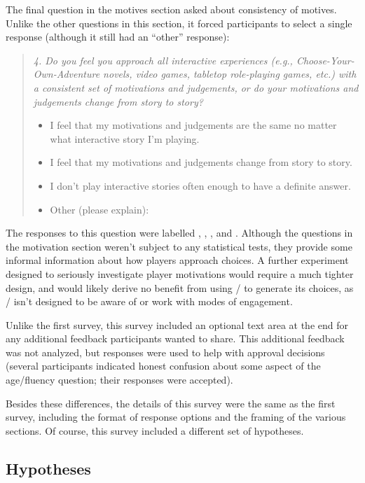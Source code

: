 The final question in the motives section asked about consistency of motives.
%
Unlike the other questions in this section, it forced participants to select a single response (although it still had an ``other'' response):
%
\begin{quote}
  \slshape
  4. Do you feel you approach all interactive experiences (e.g., Choose-Your-Own-Adventure novels, video games, tabletop role-playing games, etc.) with a consistent set of motivations and judgements, or do your motivations and judgements change from story to story?
  \begin{itemize}
    \item[\ding{109}] I feel that my motivations and judgements are the same no matter what interactive story I'm playing.
    \item[\ding{109}] I feel that my motivations and judgements change from story to story.
    \item[\ding{109}] I don't play interactive stories often enough to have a definite answer.
    \item[\ding{109}] Other (please explain):
  \end{itemize}
\end{quote}
%
The responses to this question were labelled , , , and .
%
Although the questions in the motivation section weren't subject to any statistical tests, they provide some informal information about how players approach choices.
%
A further experiment designed to seriously investigate player motivations would require a much tighter design, and would likely derive no benefit from using \dunyazad/ to generate its choices, as \dunyazad/ isn't designed to be aware of or work with modes of engagement.


Unlike the first survey, this survey included an optional text area at the end for any additional feedback participants wanted to share.
%
This additional feedback was not analyzed, but responses were used to help with approval decisions (several participants indicated honest confusion about some aspect of the age/fluency question; their responses were accepted).


Besides these differences, the details of this survey were the same as the first survey, including the format of response options and the framing of the various sections.
%
Of course, this survey included a different set of hypotheses.

\subsection{Hypotheses}

